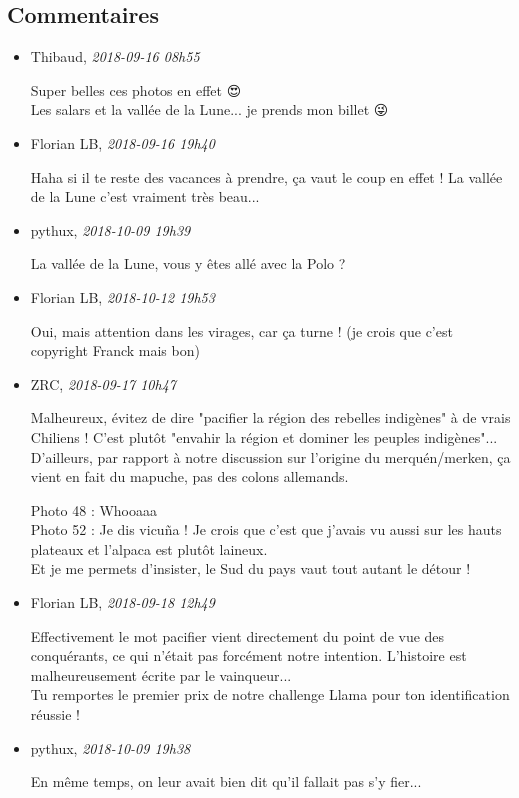 \hypertarget{commentaires}{%
\subsection{Commentaires}\label{commentaires}}

\begin{itemize}
\item
  Thibaud, \emph{2018-09-16 08h55}

  Super belles ces photos en effet 😍\\
  Les salars et la vallée de la Lune... je prends mon billet 😜
\item
  Florian LB, \emph{2018-09-16 19h40}

  Haha si il te reste des vacances à prendre, ça vaut le coup en effet !
  La vallée de la Lune c'est vraiment très beau...
\item
  pythux, \emph{2018-10-09 19h39}

  La vallée de la Lune, vous y êtes allé avec la Polo ?
\item
  Florian LB, \emph{2018-10-12 19h53}

  Oui, mais attention dans les virages, car ça turne ! (je crois que
  c'est copyright Franck mais bon)
\item
  ZRC, \emph{2018-09-17 10h47}

  Malheureux, évitez de dire "pacifier la région des rebelles indigènes"
  à de vrais Chiliens ! C'est plutôt "envahir la région et dominer les
  peuples indigènes"... D'ailleurs, par rapport à notre discussion sur
  l'origine du merquén/merken, ça vient en fait du mapuche, pas des
  colons allemands.

  Photo 48 : Whooaaa\\
  Photo 52 : Je dis vicuña ! Je crois que c'est que j'avais vu aussi sur
  les hauts plateaux et l'alpaca est plutôt laineux.\\
  Et je me permets d'insister, le Sud du pays vaut tout autant le détour
  !
\item
  Florian LB, \emph{2018-09-18 12h49}

  Effectivement le mot pacifier vient directement du point de vue des
  conquérants, ce qui n'était pas forcément notre intention. L'histoire
  est malheureusement écrite par le vainqueur...\\
  Tu remportes le premier prix de notre challenge Llama pour ton
  identification réussie !
\item
  pythux, \emph{2018-10-09 19h38}

  En même temps, on leur avait bien dit qu'il fallait pas s'y fier...
\end{itemize}
